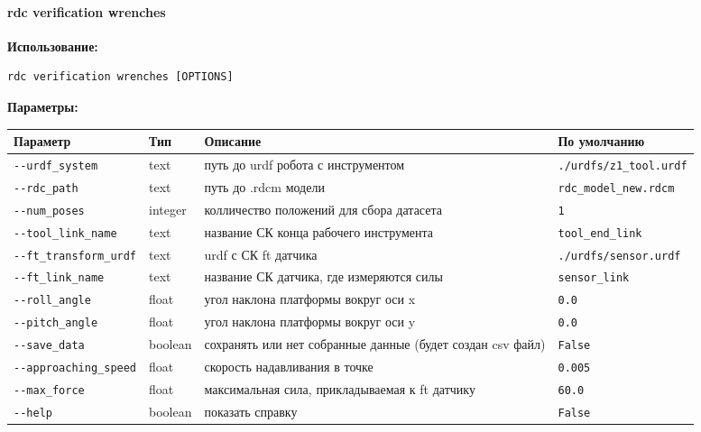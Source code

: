 \hypertarget{rdc-verification-wrenches}{%
\paragraph{rdc verification wrenches}\label{rdc-verification-wrenches}}

\textbf{Использование:}
\begin{lstlisting}[language=python, numbers=none, frame=single]
rdc verification wrenches [OPTIONS]
\end{lstlisting}

\textbf{Параметры:}
\begin{center}
\fontsize{10pt}{10pt}\selectfont
\begin{longtable}[]{p{5cm}|p{2cm}|p{3.5cm}|p{5cm}}
    \hline
\toprule()
Параметр & Тип & Описание & По умолчанию \\
\hline
\midrule()
\endhead
\texttt{-\/-urdf\_system} & text & путь до urdf робота с инструментом
&
\texttt{./urdfs/z1\_tool.urdf} \\
\hline
\texttt{-\/-rdc\_path} & text & путь до .rdcm модели &
\texttt{rdc\_model\_new.rdcm} \\
\hline
\texttt{-\/-num\_poses} & integer & колличество положений для сбора датасета &
\texttt{1} \\
\hline
\texttt{-\/-tool\_link\_name} & text & название СК конца рабочего инструмента &
\texttt{tool\_end\_link} \\
\hline
\texttt{-\/-ft\_transform\_urdf} & text & urdf с СК ft датчика &
\texttt{./urdfs/sensor.urdf} \\
\hline
\texttt{-\/-ft\_link\_name} & text & название СК датчика, где измеряются силы &
\texttt{sensor\_link} \\
\hline
\texttt{-\/-roll\_angle} & float & угол наклона платформы вокруг оси x & \texttt{0.0} \\
\hline
\texttt{-\/-pitch\_angle} & float & угол наклона платформы вокруг оси y & \texttt{0.0} \\
\hline
\texttt{-\/-save\_data} & boolean & сохранять или нет собранные данные (будет создан csv файл) & \texttt{False} \\
\hline
\texttt{-\/-approaching\_speed} & float & скорость надавливания в точке & \texttt{0.005} \\
\hline
\texttt{-\/-max\_force} & float & максимальная сила, прикладываемая к ft датчику &
\texttt{60.0} \\
\hline
\texttt{-\/-help} & boolean & показать справку &
\texttt{False} \\
\bottomrule()
\hline
\end{longtable}
\end{center}